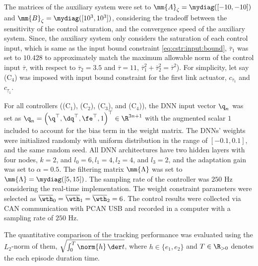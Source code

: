 \documentclass[lettersize,journal]{IEEEtran}
\begin{document}
The matrices of the auxiliary system were set to $\mm{A}_\zeta=\mydiag([-10,-10])$ and $\mm{B}_\zeta=\mydiag([10^3,10^3])$, considering the tradeoff between the sensitivity of the control saturation, and the convergence speed of the auxiliary system.
Since, the auxiliary system only considers the saturation of each control input, \ie which is same as the input bound constraint \eqref{eq:cstr:input:bound}, $\overline{\tau}_1$ was set to $10.428$ to approximately match the maximum allowable norm of the control input $\overline\tau$, with respect to $\overline{\tau}_2=3.5$ and $\overline{\tau}=11$, \ie $\overline{\tau}_1^2+\overline{\tau}_2^2=\overline{\tau}^2$).
For simplicity, let say (C$_4$) was imposed with input bound constraint for the first link actuator, \ie $c_{\overline{\tau}_1}$ and $c_{\underline{\tau}_1}$.

\hfill

For all controllers ((C$_1$), (C$_2$), (C$_3$), and (C$_4$)), the DNN input vector ${\q}_n$ was set as ${\q}_n=\left(\q^\top,\dq^\top,\fe^\top,1\right)^\top\in\R^{3n+1}$ with the augmented scalar $1$ included to account for the bias term in the weight matrix. 
The DNNs' weights were initialized randomly with uniform distribution in the range of $[-0.1,0.1]$, and the same random seed.
All DNN architectures have two hidden layers with four nodes, \ie $k=2$, and $l_0=6, l_1=4, l_2=4$, and $l_3=2$, and the adaptation gain was set to $\alpha=0.5$.
The filtering matrix $\mm{\Lambda}$ was set to $\mm{\Lambda}=\mydiag([5,15])$.
The sampling rate of the controller was $250$ Hz considering the real-time implementation.
The weight constraint parameters were selected as $\overline\wth_0=\overline\wth_1=\overline\wth_2=6$.
The control results were collected via CAN communication with PCAN USB  and recorded in a computer with a sampling rate of $250$ Hz.

The quantitative comparison of the tracking performance was evaluated using the $L_2$-norm of them, \ie $\sqrt{\int_0^T\norm{h}\,\der t}$, where $h\in\{e_1,e_2\}$ and $T\in\R_{>0}$ denotes the each episode duration time.
\end{document}
